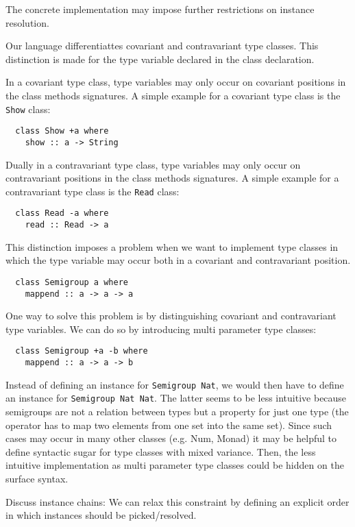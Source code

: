 The concrete implementation may impose further restrictions on instance resolution.

Our language differentiattes covariant and contravariant type classes.
This distinction is made for the type variable declared in the class declaration.

In a covariant type class, type variables may only occur on covariant positions in the class methods signatures.
A simple example for a covariant type class is the \texttt{Show} class:

\begin{verbatim}
  class Show +a where
    show :: a -> String
\end{verbatim}

Dually in a contravariant type class, type variables may only occur on contravariant positions in the class methods signatures.
A simple example for a contravariant type class is the \texttt{Read} class:

\begin{verbatim}
  class Read -a where
    read :: Read -> a
\end{verbatim}

This distinction imposes a problem when we want to implement type classes in which the type variable may occur both in a covariant and contravariant position.

\begin{verbatim}
  class Semigroup a where
    mappend :: a -> a -> a
\end{verbatim}

One way to solve this problem is by distinguishing covariant and contravariant type variables.
We can do so by introducing multi parameter type classes:

\begin{verbatim}
  class Semigroup +a -b where
    mappend :: a -> a -> b
\end{verbatim}

Instead of defining an instance for \texttt{Semigroup Nat}, we would then have to define an instance for \texttt{Semigroup Nat Nat}.
The latter seems to be less intuitive because semigroups are not a relation between types but a property for just one type (the operator has to map two elements from one set into the same set).
Since such cases may occur in many other classes (e.g. Num, Monad) it may be helpful to define syntactic sugar for type classes with mixed variance.
Then, the less intuitive implementation as multi parameter type classes could be hidden on the surface syntax.

  Discuss instance chains:
  We can relax this constraint by defining an explicit order in which instances should be picked/resolved.
  \cite{morris2010instance}
